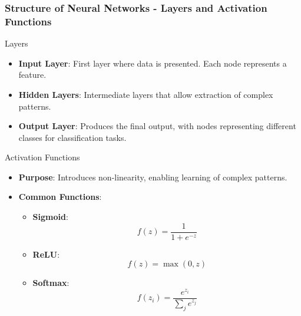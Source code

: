 \documentclass[aspectratio=169]{beamer}
\begin{document}
\begin{frame}[fragile]
    \frametitle{Structure of Neural Networks - Layers and Activation Functions}
    \begin{block}{Layers}
        \begin{itemize}
            \item \textbf{Input Layer}: First layer where data is presented. Each node represents a feature.
            \item \textbf{Hidden Layers}: Intermediate layers that allow extraction of complex patterns.
            \item \textbf{Output Layer}: Produces the final output, with nodes representing different classes for classification tasks.
        \end{itemize}
    \end{block}
    
    \begin{block}{Activation Functions}
        \begin{itemize}
            \item \textbf{Purpose}: Introduces non-linearity, enabling learning of complex patterns.
            \item \textbf{Common Functions}:
            \begin{itemize}
                \item \textbf{Sigmoid}:
                \begin{equation}
                    f(z) = \frac{1}{1 + e^{-z}}
                \end{equation}
                \item \textbf{ReLU}:
                \begin{equation}
                    f(z) = \max(0, z)
                \end{equation}
                \item \textbf{Softmax}:
                \begin{equation}
                    f(z_i) = \frac{e^{z_i}}{\sum_{j} e^{z_j}}
                \end{equation}
            \end{itemize}
        \end{itemize}
    \end{block}
\end{frame}
\end{document}
